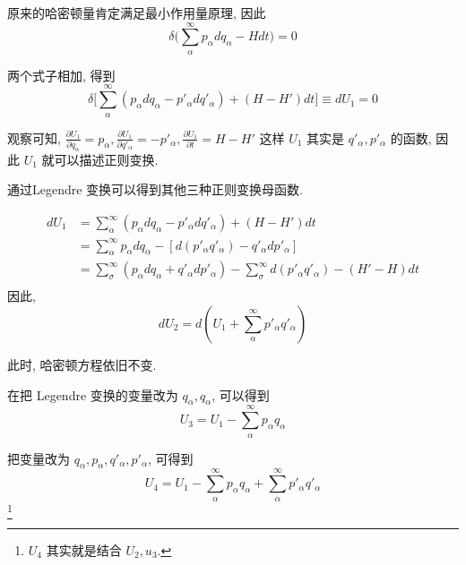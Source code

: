 \documentclass{ctexart}
\begin{document}
原来的哈密顿量肯定满足最小作用量原理, 因此
\[
\delta \biggl( 
\sum_{\alpha}^{\infty}p_\alpha dq_\alpha - Hdt  \biggr) =0	    
\] 

两个式子相加, 得到 
\[
\delta \biggl[ 
\sum_{\alpha}^{\infty} (p_\alpha dq_\alpha - p'_\alpha dq'_\alpha ) 
+ (H-H') dt \biggr] \equiv dU_1 = 0
\] 

观察可知, $\frac{\partial U_1}{\partial q_\alpha} = p_\alpha, 
\frac{\partial U_1}{\partial q'_\alpha} = -p'_\alpha, 
\frac{\partial U_1}{\partial t} = H-H'$ 
这样 $U_1$ 其实是 $q'_\alpha, p'_\alpha$ 的函数, 因此 $U_1$ 就可以描述正则变换. 

通过Legendre 变换可以得到其他三种正则变换母函数. 

\[
\begin{align*}
    dU_1 &= \sum_{\alpha}^{\infty} (p_\alpha dq_\alpha - p'_\alpha dq'_ \alpha) 
    + (H-H') dt	\\ 
    &= \sum_{\alpha }^{\infty} p_ \alpha dq_ \alpha - [ d(p'_ \alpha q'_ \alpha
    ) - q'_ \alpha dp'_ \alpha ] \\ 
    &= \sum_{\sigma }^{\infty} (p_ \alpha dq_ \alpha + q'_ \alpha dp'_ \alpha )  
    - \sum_{\sigma }^{\infty} d(p'_ \alpha q'_ \alpha ) 
    - (H' -H)dt	\\ 
\end{align*}
\] 
因此, 
\[
dU_2 = d(U_1 + \sum_{\alpha }^{\infty} p'_ \alpha q'_ \alpha ) 
\] 

此时, 哈密顿方程依旧不变. 

在把 Legendre 变换的变量改为 $q_ \alpha , q_ \alpha $, 可以得到
\[
U_3 = U_1 - \sum_{\alpha }^{\infty} p_ \alpha q_ \alpha  
\] 

把变量改为 $q_ \alpha , p_ \alpha , q'_ \alpha , p'_ \alpha $, 可得到
\[
U_4 = U_1 - \sum_{\alpha }^{\infty} p_ \alpha q_ \alpha +  
\sum_{\alpha }^{\infty} p'_ \alpha q'_ \alpha  
\] 
\footnote{$U_4$ 其实就是结合 $U_2, u_3$.}
\end{document}
